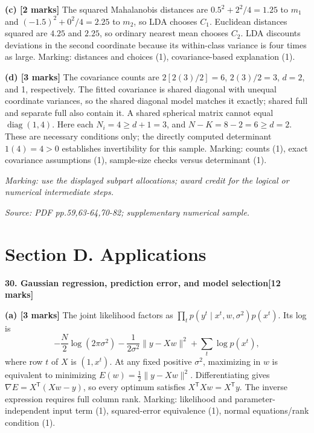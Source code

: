 \documentclass[11pt,a4paper]{article}
\begin{document}
\textbf{(c) [2 marks]} The squared Mahalanobis distances are \(0.5^2+2^2/4=1.25\) to \(m_1\) and \((-1.5)^2+0^2/4=2.25\) to \(m_2\), so LDA chooses \(C_1\). Euclidean distances squared are \(4.25\) and \(2.25\), so ordinary nearest mean chooses \(C_2\). LDA discounts deviations in the second coordinate because its within-class variance is four times as large. Marking: distances and choices (1), covariance-based explanation (1).

\textbf{(d) [3 marks]} The covariance counts are \(2[2(3)/2]=6\), \(2(3)/2=3\), \(d=2\), and 1, respectively. The fitted covariance is shared diagonal with unequal coordinate variances, so the shared diagonal model matches it exactly; shared full and separate full also contain it. A shared spherical matrix cannot equal \(\operatorname{diag}(1,4)\). Here each \(N_i=4\ge d+1=3\), and \(N-K=8-2=6\ge d=2\). These are necessary conditions only; the directly computed determinant \(1(4)=4>0\) establishes invertibility for this sample. Marking: counts (1), exact covariance assumptions (1), sample-size checks versus determinant (1).

\textit{Marking: use the displayed subpart allocations; award credit for the logical or numerical intermediate steps.}\par
{\footnotesize\textit{Source: PDF pp.59,63-64,70-82; supplementary numerical sample.}}
\newpage\section*{Section D. Applications}
\textbf{30. Gaussian regression, prediction error, and model selection}\hfill\textbf{[12 marks]}\par\medskip
\textbf{(a) [3 marks]} The joint likelihood factors as \(\prod_t p(y^t\mid x^t,w,\sigma^2)p(x^t)\). Its log is
\[
-\frac N2\log(2\pi\sigma^2)-\frac{1}{2\sigma^2}\|y-Xw\|^2+\sum_t\log p(x^t),
\]
where row \(t\) of \(X\) is \((1,x^t)\). At any fixed positive \(\sigma^2\), maximizing in \(w\) is equivalent to minimizing \(E(w)=\tfrac12\|y-Xw\|^2\). Differentiating gives \(\nabla E=X^\mathsf T(Xw-y)\), so every optimum satisfies \(X^\mathsf TXw=X^\mathsf Ty\). The inverse expression requires full column rank. Marking: likelihood and parameter-independent input term (1), squared-error equivalence (1), normal equations/rank condition (1).
\end{document}
